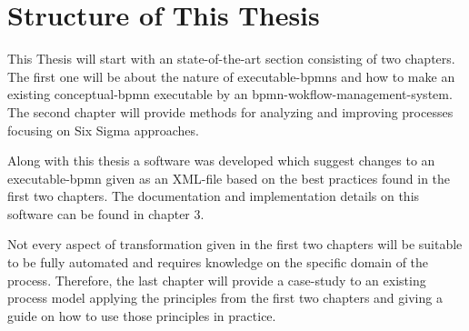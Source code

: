 \section{Structure of This Thesis}
This Thesis will start with an state-of-the-art section consisting of two chapters. The first one will be about the nature of \gls{executable-bpmn}s and how to make an existing \gls{conceptual-bpmn} executable by an \gls{bpmn-wokflow-management-system}. The second chapter will provide methods for analyzing and improving processes focusing on Six Sigma approaches.

Along with this thesis a software was developed which suggest changes to an \gls{executable-bpmn} given as an \gls{XML}-file based on the best practices found in the first two chapters. The documentation and implementation details on this software can be found in chapter 3. 

Not every aspect of transformation given in the first two chapters will be suitable to be fully automated and requires knowledge on the specific domain of the process. Therefore, the last chapter will provide a case-study to an existing process model applying the principles from the first two chapters and giving a guide on how to use those principles in practice.